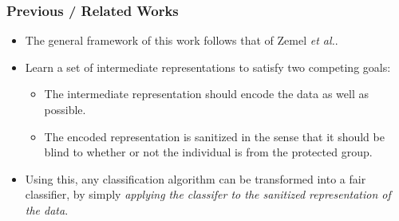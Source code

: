\documentclass{beamer}
\begin{document}
\begin{frame}
\frametitle{Previous / Related Works}

\begin{itemize}
    \item The general framework of this work follows that of Zemel {\it et al.}. \pause
    
    \item Learn a set of intermediate representations to satisfy two competing goals: \pause
    \begin{itemize}
    	\item The intermediate representation should encode the data as well as possible.
    	\item The encoded representation is sanitized in the sense that it should be \alert{blind to whether or not the individual is from the protected group}.
    \end{itemize} \pause
    
    \item Using this, any classification algorithm can be transformed into a fair classifier, by simply {\it applying the classifer to the sanitized representation of the data}.
\end{itemize}
\end{frame}
\end{document}
